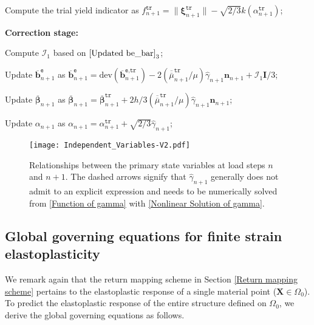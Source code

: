 \documentclass[preprint,11pt]{elsarticle}
\theoremstyle{definition}
\begin{document}
\begin{algorithm}[!htbp]
Compute the trial yield indicator as $f_{n+1}^\texttt{tr} = \lVert \boldsymbol{\xi}_{n+1}^\texttt{tr} \rVert - \sqrt{2/3} k \left( \alpha_{n+1}^\texttt{tr} \right)$;

\textbf{Correction stage:}


Compute $\mathcal{I}_1$ based on $\eqref{Updated be_bar}_3$;

Update $\overline{\mathbf{b}}_{n+1}^\texttt{e}$ as $\overline{\mathbf{b}}_{n+1}^\texttt{e}= \text{dev} \left( \overline{\mathbf{b}}_{n+1}^\texttt{e,tr} \right) - 2 \left( \overline{\overline{\mu}}_{n+1}^\texttt{tr}/\mu \right) \widehat{\gamma}_{n+1} \mathbf{n}_{n+1} + \mathcal{I}_1 \mathbf{I}/3$;

Update $\overline{\boldsymbol{\beta}}_{n+1}$ as $\overline{\boldsymbol{\beta}}_{n+1} = \overline{\boldsymbol{\beta}}_{n+1}^\texttt{tr} + 2h/3 \left( \overline{\overline{\mu}}_{n+1}^\texttt{tr}/\mu \right) \widehat{\gamma}_{n+1} \mathbf{n}_{n+1}$;

Update $\alpha_{n+1}$ as $\alpha_{n+1} = \alpha_{n+1}^\texttt{tr} + \sqrt{2/3} \widehat{\gamma}_{n+1}$;
\end{algorithm}

\begin{figure}[!htbp]
    \centering
    \texttt{[image: Independent\_Variables-V2.pdf]}
    \caption{Relationships between the primary state variables at load steps $n$ and $n+1$. The dashed arrows signify that $\widehat{\gamma}_{n+1}$ generally does not admit to an explicit expression and needs to be numerically solved from \eqref{Function of gamma} with \eqref{Nonlinear Solution of gamma}.}
    \label{Fig: Independent Variables}
\end{figure}

\subsection{Global governing equations for finite strain elastoplasticity}

We remark again that the return mapping scheme in Section \ref{Return mapping scheme} pertains to the elastoplastic response of a single material point ($\mathbf{X} \in \Omega_0$). To predict the elastoplastic response of the entire structure defined on $\Omega_0$, we derive the global governing equations as follows.
\end{document}

